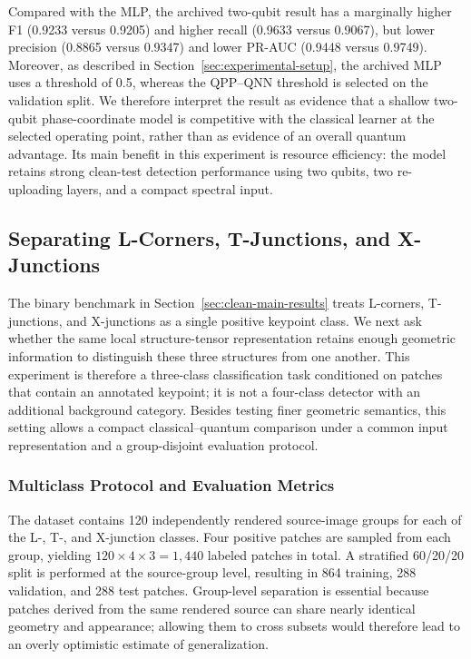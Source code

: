 \documentclass[11pt]{article}
\begin{document}
Compared with the MLP, the archived two-qubit result has a marginally higher
F1 (0.9233 versus 0.9205) and higher recall (0.9633 versus 0.9067), but lower
precision (0.8865 versus 0.9347) and lower PR-AUC (0.9448 versus 0.9749).
Moreover, as described in Section~\ref{sec:experimental-setup}, the archived
MLP uses a threshold of 0.5, whereas the QPP--QNN threshold is selected on the
validation split. We therefore interpret the result as evidence that a shallow
two-qubit phase-coordinate model is competitive with the classical learner at
the selected operating point, rather than as evidence of an overall quantum
advantage. Its main benefit in this experiment is resource efficiency: the
model retains strong clean-test detection performance using two qubits, two
re-uploading layers, and a compact spectral input.

\subsection{Separating L-Corners, T-Junctions, and X-Junctions}
\label{sec:ltx-multiclass}

The binary benchmark in Section~\ref{sec:clean-main-results} treats L-corners,
T-junctions, and X-junctions as a single positive keypoint class. We next ask
whether the same local structure-tensor representation retains enough
geometric information to distinguish these three structures from one another.
This experiment is therefore a three-class classification task conditioned on
patches that contain an annotated keypoint; it is not a four-class detector
with an additional background category. Besides testing finer geometric
semantics, this setting allows a compact classical--quantum comparison under a
common input representation and a group-disjoint evaluation protocol.

\subsubsection{Multiclass Protocol and Evaluation Metrics}

The dataset contains 120 independently rendered source-image groups for each
of the L-, T-, and X-junction classes. Four positive patches are sampled from
each group, yielding $120\times4\times3=1{,}440$ labeled patches in total. A
stratified 60/20/20 split is performed at the source-group level, resulting in
864 training, 288 validation, and 288 test patches. Group-level separation is
essential because patches derived from the same rendered source can share
nearly identical geometry and appearance; allowing them to cross subsets would
therefore lead to an overly optimistic estimate of generalization.
\end{document}
